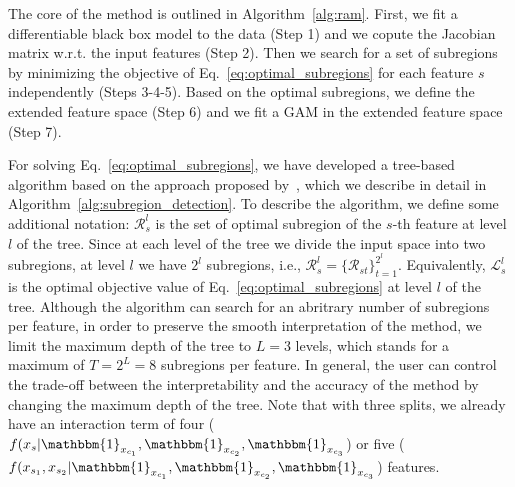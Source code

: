\documentclass[12pt]{article}
\newcommand{\when}[1]{\mathbbm{1}_{#1}}
\begin{document}
The core of the method is outlined in Algorithm~\ref{alg:ram}.
First, we fit a differentiable black box model to the data (Step 1) and we copute the Jacobian matrix w.r.t. the input features (Step 2).
Then we search for a set of subregions by minimizing the objective of Eq.~\eqref{eq:optimal_subregions}
for each feature $s$ independently (Steps 3-4-5).
Based on the optimal subregions, we define the extended feature space (Step 6) and we fit a GAM in the extended feature space (Step 7).

For solving Eq.~\eqref{eq:optimal_subregions}, we have developed a tree-based algorithm
based on the approach proposed by~\citep{herbinger2023decomposing}, which we describe in detail in Algorithm~\ref{alg:subregion_detection}.
To describe the algorithm, we define some additional notation: $\mathcal{R}_s^l$ is the set of optimal subregion of the $s$-th feature at level $l$ of the tree.
Since at each level of the tree we divide the input space into two subregions, at level $l$ we have $2^l$ subregions,
i.e., $\mathcal{R}_s^l = \{\mathcal{R}_{st}\}_{t=1}^{2^l}$.
Equivalently, $\mathcal{L}_s^l$ is the optimal objective value of Eq.~\eqref{eq:optimal_subregions} at level $l$ of the tree.
Although the algorithm can search for an abritrary number of subregions per feature,
in order to preserve the smooth interpretation of the method,
we limit the maximum depth of the tree to $L=3$ levels,
which stands for a maximum of $T = 2^L = 8$ subregions per feature.
In general, the user can control the trade-off between the interpretability and the accuracy of the method by changing the maximum depth of the tree.
Note that with three splits, we already have an interaction term of
four ($f(x_s | \when{x_{c_1}}, \when{x_{c_2}}, \when{x_{c_3}}$) or
five ($f(x_{s_1}, x_{s_{2}} | \when{x_{c_1}}, \when{x_{c_2}}, \when{x_{c_3}}$) features.
\end{document}
